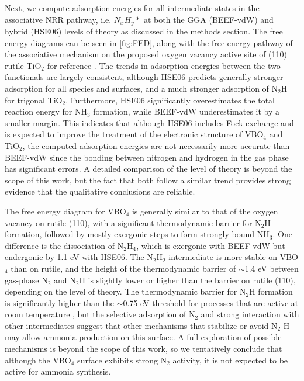 Next, we compute adsorption energies for all intermediate states in the associative NRR pathway, i.e. $N_xH_y*$ at both the GGA (BEEF-vdW) and hybrid (HSE06) levels of theory as discussed in the methods section. The free energy diagrams can be seen in \ref{fig:FED}, along with the free energy pathway of the associative mechanism on the proposed oxygen vacancy active site of (110) rutile TiO$_2$ for reference \cite{Comer_sustainable}. The trends in adsorption energies between the two functionals are largely consistent, although HSE06 predicts generally stronger adsorption for all species and surfaces, and a much stronger adsorption of N$_2$H for trigonal TiO$_2$. Furthermore, HSE06 significantly overestimates the total reaction energy for NH$_3$ formation, while BEEF-vdW underestimates it by a smaller margin. This indicates that although HSE06 includes Fock exchange and is expected to improve the treatment of the electronic structure of VBO$_4$ and TiO$_2$, the computed adsorption energies are not necessarily more accurate than BEEF-vdW since the bonding between nitrogen and hydrogen in the gas phase has significant errors. A detailed comparison of the level of theory is beyond the scope of this work, but the fact that both follow a similar trend provides strong evidence that the qualitative conclusions are reliable.

The free energy diagram for VBO$_4$ is generally similar to that of the oxygen vacancy on rutile (110), with a significant thermodynamic barrier for N$_2$H formation, followed by mostly exergonic steps to form strongly bound NH$_3$. One difference is the dissociation of N$_2$H$_4$, which is exergonic with BEEF-vdW but endergonic by 1.1 eV with HSE06. The N$_2$H$_2$ intermediate is more stable on VBO$_4$ than on rutile, and the height of the thermodynamic barrier of $\sim$1.4 eV between gas-phase N$_2$ and N$_2$H is slightly lower or higher than the barrier on rutile (110), depending on the level of theory. The thermodynamic barrier for N$_2$H formation is significantly higher than the $\sim$0.75 eV threshold for processes that are active at room temperature \cite{Iriawan_2021}, but the selective adsorption of N$_2$ and strong interaction with other intermediates suggest that other mechanisms that stabilize or avoid N$_2$ H may allow ammonia production on this surface. A full exploration of possible mechanisms is beyond the scope of this work, so we tentatively conclude that although the VBO$_4$ surface exhibits strong N$_2$ activity, it is not expected to be active for ammonia synthesis.

